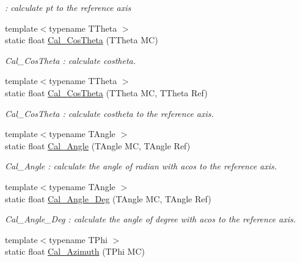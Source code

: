 \begin{DoxyCompactItemize}
\begin{DoxyCompactList}\small\item\em : calculate pt to the reference axis \item\end{DoxyCompactList}\item 
{\footnotesize template$<$typename TTheta $>$ }\\static float \hyperlink{classToolSet_1_1CMC_a7142700aa3c1b586b976e9d71301c7bc}{Cal\_\-CosTheta} (TTheta MC)
\begin{DoxyCompactList}\small\item\em Cal\_\-CosTheta : calculate costheta. \item\end{DoxyCompactList}\item 
{\footnotesize template$<$typename TTheta $>$ }\\static float \hyperlink{classToolSet_1_1CMC_a91c74f61d1c9656e68f4b1037976a51b}{Cal\_\-CosTheta} (TTheta MC, TTheta Ref)
\begin{DoxyCompactList}\small\item\em Cal\_\-CosTheta : calculate costheta to the reference axis. \item\end{DoxyCompactList}\item 
{\footnotesize template$<$typename TAngle $>$ }\\static float \hyperlink{classToolSet_1_1CMC_a0637a061bf4ecd9084b794023cc11816}{Cal\_\-Angle} (TAngle MC, TAngle Ref)
\begin{DoxyCompactList}\small\item\em Cal\_\-Angle : calculate the angle of radian with acos to the reference axis. \item\end{DoxyCompactList}\item 
{\footnotesize template$<$typename TAngle $>$ }\\static float \hyperlink{classToolSet_1_1CMC_a58389b8e6c06afb39377d6d078e5616f}{Cal\_\-Angle\_\-Deg} (TAngle MC, TAngle Ref)
\begin{DoxyCompactList}\small\item\em Cal\_\-Angle\_\-Deg : calculate the angle of degree with acos to the reference axis. \item\end{DoxyCompactList}\item 
{\footnotesize template$<$typename TPhi $>$ }\\static float \hyperlink{classToolSet_1_1CMC_a3c8cfd47eac44d6e39a38598bb9158f1}{Cal\_\-Azimuth} (TPhi MC)

\end{DoxyCompactItemize}
